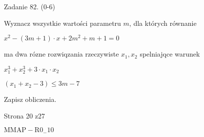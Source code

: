 \documentclass[a4paper,12pt]{article}
\begin{document}
Zadanie 82. (0-6)

Wyznacz wszystkie wartości parametru $m$, dla których równanie

$x^{2}-(3m+1)\cdot x+2m^{2}+m+1=0$

ma dwa rózne rozwiqzania rzeczywiste $x_{1}, x_{2}$ spelniajqce warunek

$x_{1}^{3}+x_{2}^{3}+3\cdot x_{1}\cdot x_{2}$

$(x_{1}+x_{2}-3)\leq 3m-7$

Zapisz obliczenia.

Strona 20 z27

$\mathrm{M}\mathrm{M}\mathrm{A}\mathrm{P}-\mathrm{R}0_{-}10$
\end{document}
